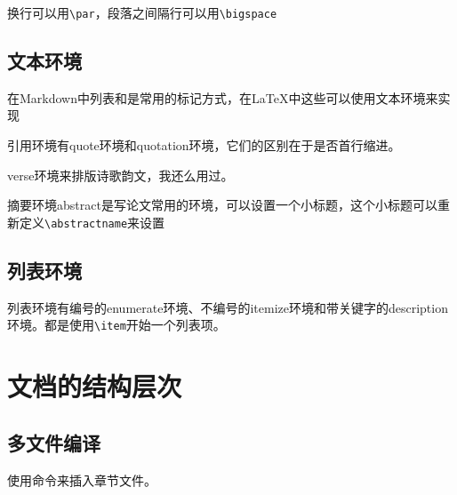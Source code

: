  换行可以用\verb|\par|，段落之间隔行可以用\verb|\bigspace|
\subsection{文本环境}
在Markdown中{\color{red}列表}和{\color{red}{引用}}是常用的标记方式，在\LaTeX 中这些可以使用文本环境来实现

引用环境有quote环境和quotation环境，它们的区别在于是否首行缩进。

verse环境来排版诗歌韵文，我还么用过。

摘要环境abstract是写论文常用的环境，可以设置一个小标题，这个小标题可以重新定义\verb"\abstractname"来设置
\subsection{列表环境}

列表环境有编号的enumerate环境、不编号的itemize环境和带关键字的description环境。都是使用\verb|\item|开始一个列表项。
\section{文档的结构层次}

\subsection{多文件编译}

使用\verb||命令来插入章节文件。

\section{}